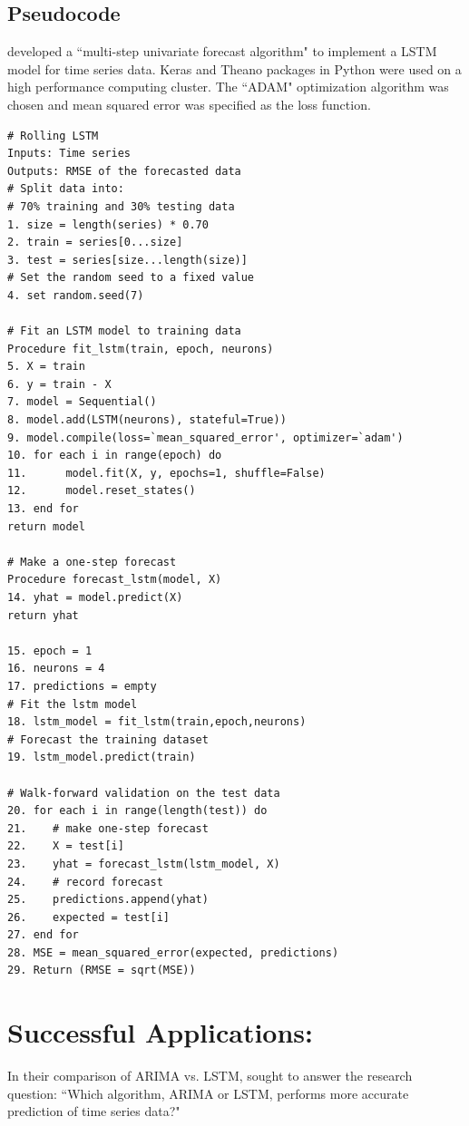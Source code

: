 \documentclass[twoside,11pt]{article}
\begin{document}
\subsection{Pseudocode}
\cite{siami-namini:2018} developed a ``multi-step univariate forecast algorithm" to implement a LSTM model for time series data. Keras and Theano packages in Python were used on a high performance computing cluster. The ``ADAM" optimization algorithm was chosen and mean squared error was specified as the loss function.
\begin{lstlisting}[frame=single]
# Rolling LSTM
Inputs: Time series
Outputs: RMSE of the forecasted data
# Split data into:
# 70% training and 30% testing data
1. size = length(series) * 0.70
2. train = series[0...size]
3. test = series[size...length(size)]
# Set the random seed to a fixed value
4. set random.seed(7)

# Fit an LSTM model to training data
Procedure fit_lstm(train, epoch, neurons)
5. X = train
6. y = train - X
7. model = Sequential()
8. model.add(LSTM(neurons), stateful=True))
9. model.compile(loss=`mean_squared_error', optimizer=`adam')
10. for each i in range(epoch) do
11.      model.fit(X, y, epochs=1, shuffle=False)
12.      model.reset_states()
13. end for
return model

# Make a one-step forecast
Procedure forecast_lstm(model, X)
14. yhat = model.predict(X)
return yhat

15. epoch = 1
16. neurons = 4
17. predictions = empty
# Fit the lstm model
18. lstm_model = fit_lstm(train,epoch,neurons)
# Forecast the training dataset
19. lstm_model.predict(train)

# Walk-forward validation on the test data
20. for each i in range(length(test)) do
21.    # make one-step forecast
22.    X = test[i]
23.    yhat = forecast_lstm(lstm_model, X)
24.    # record forecast
25.    predictions.append(yhat)
26.    expected = test[i]
27. end for
28. MSE = mean_squared_error(expected, predictions)
29. Return (RMSE = sqrt(MSE))
\end{lstlisting}

\section{Successful Applications: \cite{siami-namini:2018}}
\label{compare}
In their comparison of ARIMA vs. LSTM, \cite{siami-namini:2018} sought to answer the research question: ``Which algorithm, ARIMA or LSTM, performs more accurate prediction of time series data?"
\end{document}
